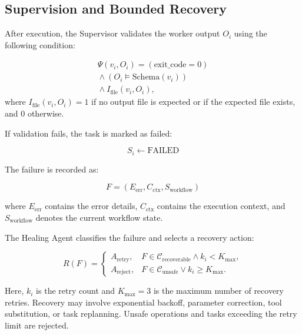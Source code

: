 \documentclass[conference]{IEEEtran}
\begin{document}
\subsection{Supervision and Bounded Recovery}

After execution, the Supervisor validates the worker output $O_i$ using the following condition:

\begin{equation}
\begin{gathered}
\Psi(v_i,O_i) =
(\text{exit\_code}=0)\\
{}\land (O_i \models \text{Schema}(v_i))\\
{}\land I_{\text{file}}(v_i,O_i),
\end{gathered}
\end{equation}
where $I_{\text{file}}(v_i,O_i)=1$ if no output file is expected or if the expected file exists, and $0$ otherwise.

If validation fails, the task is marked as failed:

\begin{equation}
S_i \leftarrow \text{FAILED}
\end{equation}

The failure is recorded as:

\begin{equation}
F = (E_{\text{err}},C_{\text{ctx}},S_{\text{workflow}})
\end{equation}

where $E_{\text{err}}$ contains the error details, $C_{\text{ctx}}$ contains the execution context, and $S_{\text{workflow}}$ denotes the current workflow state.

The Healing Agent classifies the failure and selects a recovery action:

\begin{equation}
R(F) =
\begin{cases}
A_{\text{retry}}, &
F \in \mathcal{C}_{\text{recoverable}}
\land k_i < K_{\text{max}},\\
A_{\text{reject}}, &
F \in \mathcal{C}_{\text{unsafe}}
\lor k_i \geq K_{\text{max}}.
\end{cases}
\end{equation}

Here, $k_i$ is the retry count and $K_{\text{max}}=3$ is the maximum number of recovery retries. Recovery may involve exponential backoff, parameter correction, tool substitution, or task replanning. Unsafe operations and tasks exceeding the retry limit are rejected.
\end{document}
